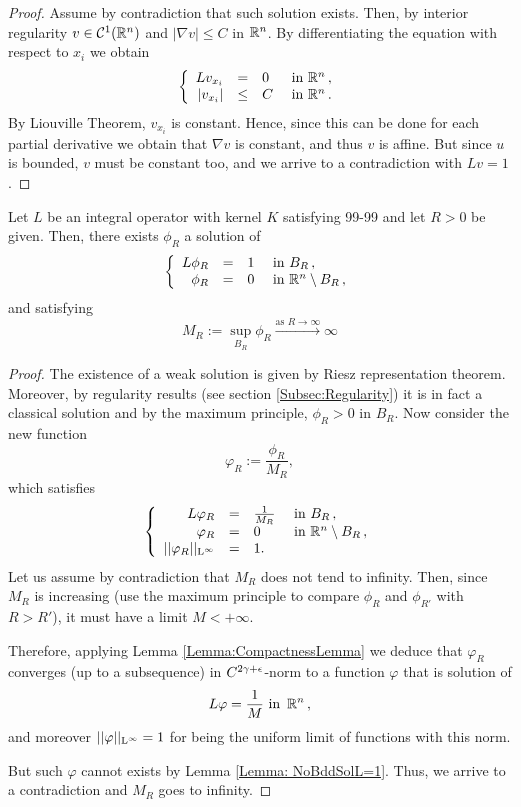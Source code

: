 \begin{proof}
Assume by contradiction that such solution exists. Then, by interior regularity \todo{!!!!} $v\in\mathcal{C}^{1}(\mathbb{R}^n)$ and $|\nabla v|\leq C$ in $\mathbb{R}^n$. By differentiating the equation with respect to $x_i$ we obtain
\begin{equation*}
\left\{\begin{array}{rcll}
L v_{x_i} &=& 0 & \textrm{ in } \mathbb{R}^n\,,\\
|v_{x_i}| &\leq& C & \textrm{ in } \mathbb{R}^n\,.
\end{array} \right.
\end{equation*}
By Liouville Theorem, $v_{x_i}$ is constant.  Hence, since this can be done for each partial derivative we obtain that $\nabla v$ is constant, and thus $v$ is affine. But since $u$ is bounded, $v$ must be constant too, and we arrive to a contradiction with $Lv=1$.
\end{proof}

\begin{lemma}
\label{Lemma: SolBall}
Let $L$ be an integral operator with kernel $K$ satisfying 99-99 and let $R>0$ be given. Then, there exists $\phi_R$ a solution of
\begin{equation*}
\left\{\begin{array}{rcll}
L \phi_R &=& 1 & \textrm{ in } B_R\,,\\
\phi_R &=& 0 & \textrm{ in } \mathbb{R}^n\setminus B_R\,,
\end{array} \right.
\end{equation*}
and satisfying
$$ M_R:= \sup_{B_R} \phi_R \xrightarrow{\text{as } R\to \infty}{} \infty $$
\end{lemma}
\begin{proof}
The existence of a weak solution is given by Riesz representation theorem. Moreover, by regularity results (see section \ref{Subsec:Regularity}) it is in fact a classical solution and by the maximum principle, $\phi_R>0$ in $B_R$. Now consider the new function
$$ \varphi_R := \frac{\phi_R}{M_R}, $$
which satisfies
\begin{equation}
\left\{\begin{array}{rcll}
L \varphi_R &=& \frac{1}{M_R} & \textrm{ in } B_R\,,\\
\varphi_R &=& 0 & \textrm{ in } \mathbb{R}^n\setminus B_R\,, \label{Eq: varphi}\\
||\varphi_R||_{\mathrm{L}^{\infty}} &=& 1.
\end{array} \right.
\end{equation}
Let us assume by contradiction that $M_R$ does not tend to infinity. Then, since $M_R$ is increasing (use the maximum principle to compare $\phi_R$ and $\phi_{R'}$ with $R>R'$), it must have a limit $M<+\infty$.

Therefore, applying Lemma \ref{Lemma:CompactnessLemma} we deduce that $\varphi_R$ converges (up to a subsequence) in $C^{2\gamma+\epsilon}$-norm to a function $\varphi$ that is solution of
$$ L \varphi = \frac{1}{M}  \textrm{ in } \,\mathbb{R}^n\,, $$
and moreover $||\varphi||_{\mathrm{L}^{\infty}}=1$ for being the uniform limit of functions with this norm.

But such $\varphi$ cannot exists by Lemma \ref{Lemma: NoBddSolL=1}. Thus, we arrive to a contradiction and $M_R$ goes to infinity. 
\end{proof}

